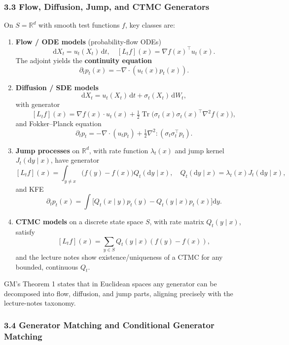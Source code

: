 \documentclass[
]{article}
\theoremstyle{remark}
\begin{document}
\subsubsection{3.3 Flow, Diffusion, Jump, and CTMC
Generators}\label{flow-diffusion-jump-and-ctmc-generators}

On \(S = \mathbb{R}^d\) with smooth test functions \(f\), key classes
are: \cite{lecnotes2026,gm-companion-notes,gm2025}

\begin{enumerate}
\def\labelenumi{\arabic{enumi}.}
\item
  \textbf{Flow / ODE models} (probability-flow ODEs) \[
  \mathrm{d}X_t = u_t(X_t) \, \mathrm{d}t, \quad [L_t f](x) = \nabla f(x)^\top u_t(x).
  \] The adjoint yields the \textbf{continuity equation} \[
  \partial_t p_t(x) = - \nabla \cdot (u_t(x) p_t(x)).
  \]
\item
  \textbf{Diffusion / SDE models} \[
  \mathrm{d}X_t = u_t(X_t) \, \mathrm{d}t + \sigma_t(X_t) \, \mathrm{d}W_t, 
  \] with generator \[
  [L_t f](x) = \nabla f(x) \cdot u_t(x) + \tfrac{1}{2} \operatorname{Tr}\bigl(\sigma_t(x) \sigma_t(x)^\top \nabla^2 f(x)\bigr),
  \] and Fokker--Planck equation \[
  \partial_t p_t = -\nabla \cdot (u_t p_t) + \tfrac{1}{2} \nabla^2 : (\sigma_t \sigma_t^\top p_t).
  \]
\item
  \textbf{Jump processes} on \(\mathbb{R}^d\), with rate function
  \(\lambda_t(x)\) and jump kernel \(J_t(\mathrm{d}y \mid x)\), have
  generator \[
  [L_t f](x) = \int_{y \neq x} \bigl(f(y) - f(x)\bigr) Q_t(\mathrm{d}y \mid x), \quad Q_t(\mathrm{d}y \mid x) = \lambda_t(x) J_t(\mathrm{d}y \mid x),
  \] and KFE \[
  \partial_t p_t(x) = \int \bigl[Q_t(x \mid y) p_t(y) - Q_t(y \mid x) p_t(x)\bigr] \mathrm{d}y.
  \]
\item
  \textbf{CTMC models} on a discrete state space \(S\), with rate matrix
  \(Q_t(y \mid x)\), satisfy \[
  [L_t f](x) = \sum_{y \in S} Q_t(y \mid x) (f(y) - f(x)),
  \] and the lecture notes show existence/uniqueness of a CTMC for any
  bounded, continuous \(Q_t\). \cite{lecnotes2026}
\end{enumerate}

GM's Theorem 1 states that in Euclidean spaces any generator can be
decomposed into flow, diffusion, and jump parts, aligning precisely with
the lecture-notes taxonomy. \cite{gm2025,lecnotes2026}

\subsubsection{3.4 Generator Matching and Conditional Generator
Matching}\label{generator-matching-and-conditional-generator-matching}
\end{document}
